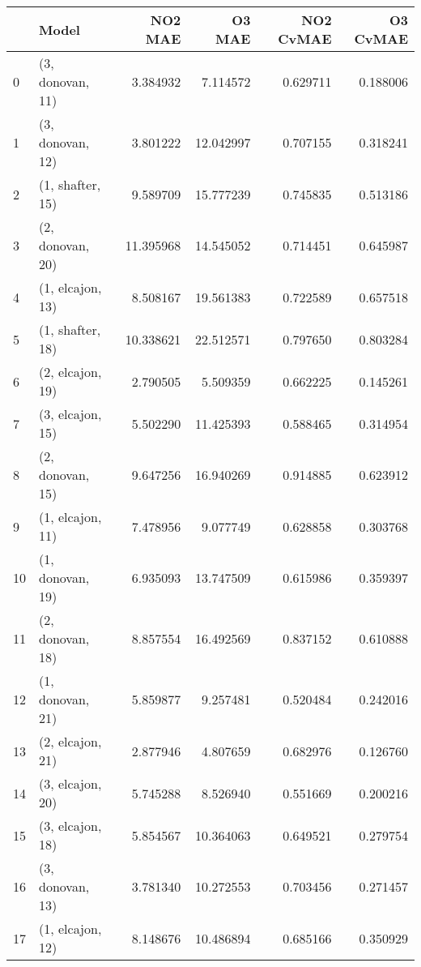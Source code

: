 \begin{tabular}{llrrrr}
\toprule
{} &             Model &    NO2 MAE &     O3 MAE &  NO2 CvMAE &  O3 CvMAE \\
\midrule
0  &  (3, donovan, 11) &   3.384932 &   7.114572 &   0.629711 &  0.188006 \\
1  &  (3, donovan, 12) &   3.801222 &  12.042997 &   0.707155 &  0.318241 \\
2  &  (1, shafter, 15) &   9.589709 &  15.777239 &   0.745835 &  0.513186 \\
3  &  (2, donovan, 20) &  11.395968 &  14.545052 &   0.714451 &  0.645987 \\
4  &  (1, elcajon, 13) &   8.508167 &  19.561383 &   0.722589 &  0.657518 \\
5  &  (1, shafter, 18) &  10.338621 &  22.512571 &   0.797650 &  0.803284 \\
6  &  (2, elcajon, 19) &   2.790505 &   5.509359 &   0.662225 &  0.145261 \\
7  &  (3, elcajon, 15) &   5.502290 &  11.425393 &   0.588465 &  0.314954 \\
8  &  (2, donovan, 15) &   9.647256 &  16.940269 &   0.914885 &  0.623912 \\
9  &  (1, elcajon, 11) &   7.478956 &   9.077749 &   0.628858 &  0.303768 \\
10 &  (1, donovan, 19) &   6.935093 &  13.747509 &   0.615986 &  0.359397 \\
11 &  (2, donovan, 18) &   8.857554 &  16.492569 &   0.837152 &  0.610888 \\
12 &  (1, donovan, 21) &   5.859877 &   9.257481 &   0.520484 &  0.242016 \\
13 &  (2, elcajon, 21) &   2.877946 &   4.807659 &   0.682976 &  0.126760 \\
14 &  (3, elcajon, 20) &   5.745288 &   8.526940 &   0.551669 &  0.200216 \\
15 &  (3, elcajon, 18) &   5.854567 &  10.364063 &   0.649521 &  0.279754 \\
16 &  (3, donovan, 13) &   3.781340 &  10.272553 &   0.703456 &  0.271457 \\
17 &  (1, elcajon, 12) &   8.148676 &  10.486894 &   0.685166 &  0.350929 \\
\bottomrule
\end{tabular}
